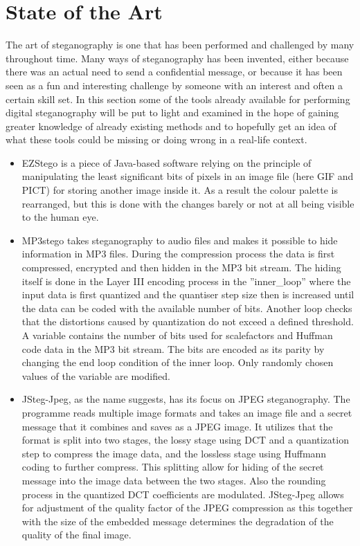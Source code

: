 \section{State of the Art}
The art of steganography is one that has been performed and challenged by many throughout time. Many ways of steganography has been invented, either because there was an actual need to send a confidential message, or because it has been seen as a fun and interesting challenge by someone with an interest and often a certain skill set. In this section some of the tools already available for performing digital steganography will be put to light and examined in the hope of gaining greater knowledge of already existing methods and to hopefully get an idea of what these tools could be missing or doing wrong in a real-life context. 

\begin{itemize}
	\item EZStego is a piece of Java-based software relying on the principle of manipulating the least significant bits of pixels in an image file (here GIF and PICT) for storing another image inside it. \citep{EthicalHacking2010} As a result the colour palette is rearranged, but this is done with the changes barely or not at all being visible to the human eye. 
	
	\item MP3stego takes steganography to audio files and makes it possible to hide information in MP3 files. During the compression process the data is first compressed, encrypted and then hidden in the MP3 bit stream. The hiding itself is done in the Layer III encoding process in the ''inner_loop'' where the input data is first quantized and the quantiser step size then is increased until the data can be coded with the available number of bits. Another loop checks that the distortions caused by quantization do not exceed a defined threshold. A variable contains the number of bits used for scalefactors and Huffman code data in the MP3 bit stream. The bits are encoded as its parity by changing the end loop condition of the inner loop. Only randomly chosen values of the variable are modified. \citep{MP3Stego}
	
	\item JSteg-Jpeg, as the name suggests, has its focus on JPEG steganography. The programme reads multiple image formats and takes an image file and a secret message that it combines and saves as a JPEG image. It utilizes that the format is split into two stages, the lossy stage using DCT and a quantization step to compress the image data, and the lossless stage using Huffmann coding to further compress. This splitting allow for hiding of the secret message into the image data between the two stages. Also the rounding process in the quantized DCT coefficients are modulated. JSteg-Jpeg allows for adjustment of the quality factor of the JPEG compression as this together with the size of the embedded message determines the degradation of the quality of the final image. \citep{ImageProcessing}
\end{itemize}

